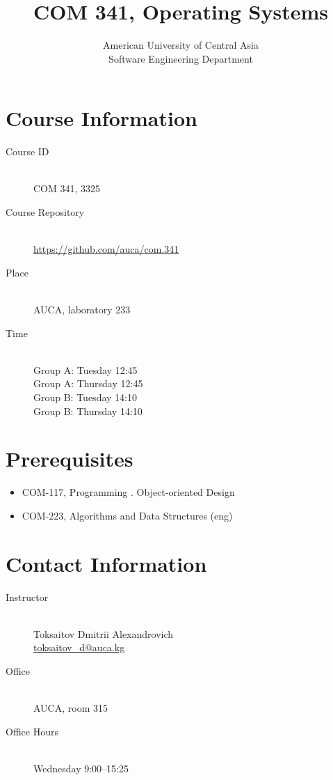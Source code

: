 \documentclass[12pt,a4paper,oneside]{article}
\newcommand{\R}[1]{\uppercase\expandafter{\romannumeral #1\relax}}
\begin{document}
    \title{COM 341, Operating Systems}
    \author{
        American University of Central Asia\\
        Software Engineering Department
    }
    \date{}
    \maketitle

    \section{Course Information}

        \begin{description}
            \item[Course ID]\hfill\\
                COM 341, 3325
            \item[Course Repository]\hfill\\
                \url{https://github.com/auca/com.341}
            \item[Place]\hfill\\
                AUCA, laboratory 233
            \item[Time]\hfill\\
                Group A: Tuesday 12:45\\
                Group A: Thursday 12:45\\
                Group B: Tuesday 14:10\\
                Group B: Thursday 14:10\\
        \end{description}

    \section{Prerequisites}

        \begin{itemize}
            \item COM-117, Programming \R{2}. Object-oriented Design
            \item COM-223, Algorithms and Data Structures (eng)
        \end{itemize}

    \section{Contact Information}

        \begin{description}
            \item[Instructor]\hfill\\
                Toksaitov Dmitrii Alexandrovich\\
                \href{mailto:toksaitov_d@auca.kg}{toksaitov\_d@auca.kg}
            \item[Office]\hfill\\
                AUCA, room 315
            \item[Office Hours]\hfill\\
                Wednesday 9:00--15:25
        \end{description}
\end{document}
